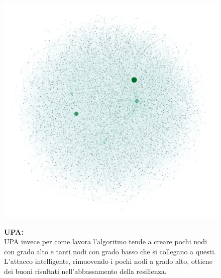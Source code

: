 \documentclass{article}
\begin{document}
\begin{figure}[H]
	\begin{minipage}{0.4\linewidth}
		\centering
		\includegraphics[width=0.9\linewidth, valign=t]{figures/UPA}
	\end{minipage}
	\begin{minipage}{0.55\linewidth}
		\textbf{UPA:}\\
		UPA invece per come lavora l'algoritmo tende a creare pochi nodi con grado alto e tanti nodi con grado basso che si collegano a questi.\\
		L'attacco intelligente, rimuovendo i pochi nodi a grado alto, ottiene dei buoni risultati nell'abbassamento della resilienza.
	\end{minipage}
\end{figure}
\end{document}
